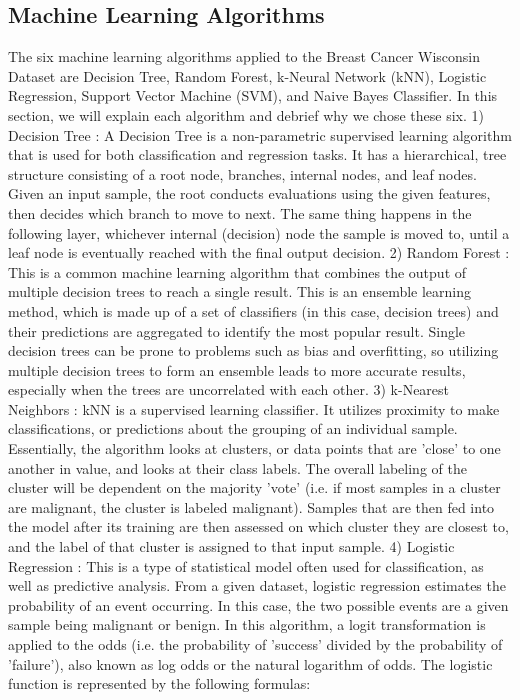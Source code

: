 \documentclass[conference]{IEEEtran}
\begin{document}
\subsection{Machine Learning Algorithms}
The six machine learning algorithms applied to the Breast Cancer Wisconsin Dataset are Decision Tree, Random Forest, k-Neural Network (kNN), Logistic Regression, Support Vector Machine (SVM), and Naive Bayes Classifier. In this section, we will explain each algorithm and debrief why we chose these six. 
1) Decision Tree : A Decision Tree is a non-parametric supervised learning algorithm that is used for both classification and regression tasks. It has a hierarchical, tree structure consisting of a root node, branches, internal nodes, and leaf nodes. Given an input sample, the root conducts evaluations using the given features, then decides which branch to move to next. The same thing happens in the following layer, whichever internal (decision) node the sample is moved to, until a leaf node is eventually reached with the final output decision. 
2) Random Forest : This is a common machine learning algorithm that combines the output of multiple decision trees to reach a single result. This is an ensemble learning method, which is made up of a set of classifiers (in this case, decision trees) and their predictions are aggregated to identify the most popular result. Single decision trees can be prone to problems such as bias and overfitting, so utilizing multiple decision trees to form an ensemble leads to more accurate results, especially when the trees are uncorrelated with each other.
3) k-Nearest Neighbors : kNN is a supervised learning classifier. It utilizes proximity to make classifications, or predictions about the grouping of an individual sample. Essentially, the algorithm looks at clusters, or data points that are 'close' to one another in value, and looks at their class labels. The overall labeling of the cluster will be dependent on the majority 'vote' (i.e. if most samples in a cluster are malignant, the cluster is labeled malignant). Samples that are then fed into the model after its training are then assessed on which cluster they are closest to, and the label of that cluster is assigned to that input sample.
4) Logistic Regression : This is a type of statistical model often used for classification, as well as predictive analysis. From a given dataset, logistic regression estimates the probability of an event occurring. In this case, the two possible events are a given sample being malignant or benign. In this algorithm, a logit transformation is applied to the odds (i.e. the probability of 'success' divided by the probability of 'failure'), also known as log odds or the natural logarithm of odds. The logistic function is represented by the following formulas:
\end{document}
